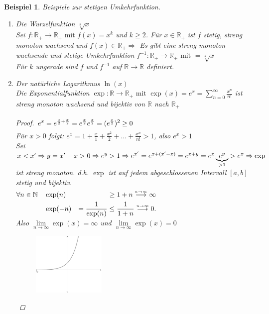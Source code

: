 \documentclass[a4paper,titlepage,oneside]{article}
\def\N{\ensuremath{\mathbb{N}} }
\def\R{\ensuremath{\mathbb{R}} }
\newcommand{\suminf}[2][n]{\ensuremath{\sum_{#1= 0}^{\infty}{#2}}}
\renewcommand{\liminf}[2][n]{\ensuremath{\lim\limits_{#1 \rightarrow \infty}{#2}}}
\newcommand{\longtoinf}[1][n]{\ensuremath{\overset{\scriptscriptstyle{#1 \to \infty}}{\longrightarrow}}}
\theoremstyle{thmstyle}
\newtheorem{bsp}[satz]{Beispiel}
\theoremstyle{subthmstyle}
\begin{document}
\begin{bsp}
Beispiele zur stetigen Umkehrfunktion.
\begin{enumerate}
\item Die Wurzelfunktion $ \displaystyle \sqrt[k]{x}$\\
Sei $f: \R_+ \to \R_+ \text{ mit } f(x) = x^k $ und $ k \ge 2$.
Für $x \in \R_+$ ist $f$ stetig, streng monoton wachsend und $f(x) \in \R_+ \Rightarrow $ Es gibt eine streng monoton wachsende und stetige Umkehrfunktion $ \displaystyle f^{-1}: \R_+ \to \R_+ \text{ mit } = \sqrt[k]{x}$\\
Für $k$ ungerade sind $f$ und $f^{-1}$ auf $\R \to \R$ definiert.
\item Der natürliche Logarithmus $\ln(x)$\\
Die Exponentialfunktion $ \displaystyle \exp: \R \to \R_+ \text{ mit } \exp(x) = e^x = \suminf{\frac{x^n}{n!}}$ ist streng monoton wachsend und bijektiv von \R nach $\R_+$
\begin{proof}
	$ \displaystyle \vphantom{\frac{1}{2}} e^x = e^{\frac{x}{2} + \frac{x}{2}} = e^{\frac{x}{2}} e^{\frac{x}{2}} = (e^{\frac{x}{2}})^2 \ge 0$\\
	Für $x > 0$ folgt: $ \displaystyle e^x = 1 + \frac{x}{1} + \frac{x^2}{2} + \dots + \frac{x^n}{n!} > 1$, also $e^x > 1$\\
	Sei $\vphantom{\frac{1}{2}}x < x' \Rightarrow y = x' - x > 0 \Rightarrow e^y > 1 \Rightarrow e^{x'} = e^{x+(x'-x)} = e^{x+y} = e^x \underbrace{e^y}_{> 1} > e^x \Rightarrow \exp$ ist streng monoton.
	d.h. $\exp$ ist auf jedem abgeschlossenen Intervall $[a,b]$ stetig und bijektiv.\\
	$ \displaystyle  \vphantom{\frac{1}{2}} \forall n\in\N \quad \begin{aligned}[t]	&\exp(n) &\ge 1 + n \longtoinf \infty \\
					&\exp(-n) &= \frac{1}{\exp(n)} \le \frac{1}{1+n} \longtoinf 0.\end{aligned}$\\
	Also $\liminf{\exp(x)} = \infty$ und $\liminf{\exp(x)} = 0$\\
\begin{figure}[ht]\centering
 \includegraphics[width=0.33\textwidth]{images/exponential_funktion.png}

\end{figure}
\end{proof}
\end{enumerate}
\end{bsp}
\end{document}
